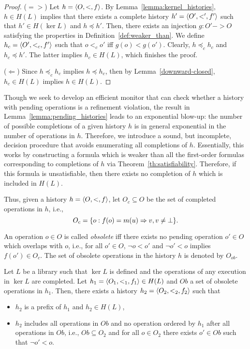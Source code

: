 \begin{proof}

($=>$) Let $h=\left\langle {O,<,f} \right\rangle$. By Lemma~\ref{lemma:kernel_histories}, $h\in H(L)$ implies that there exists 
a complete history $h'=\left\langle {O',<',f'} \right\rangle$ such that $h'\in H(\ker L)$ and $h\preceq h'$. 
Then, there exists an injection $g:O' -> O$ 
satisfying the properties in Definition~\ref{def:weaker_than}. We define $h_c=\left\langle {O',<_c,f'} \right\rangle$ 
such that $o<_c o'$ iff $g(o) < g(o')$. Clearly, $h\preceq_c h_c$ and $h_c\preceq h'$. The latter implies
$h_c\in H(L)$, which finishes the proof.

($\Leftarrow$) Since $h\preceq_c h_c$ implies $h\preceq h_c$, then by Lemma~\ref{downward-closed},
$h_c\in H(L)$ implies $h\in H(L)$.

\end{proof}

Though we seek to develop an efficient monitor that can check whether a history with pending
operations is a refinement violation, the result in Lemma~\ref{lemma:pending_histories}
leads to an exponential blow-up: the number of possible completions of a given history $h$
is in general exponential in the number of operations in $h$. Therefore, we introduce
a sound, but incomplete, decision procedure that avoids enumerating all completions of $h$.
Essentially, this works by constructing a formula which is weaker than all the first-order formulas
corresponding to completions of $h$ via Theorem~\ref{th:satisfiability}. Therefore, if this formula
is unsatisfiable, then there exists no completion of $h$ which is included in $H(L)$.

Thus, given a history $h=\left\langle {O,<,f} \right\rangle$, let $O_c\subseteq O$ be the set of completed operations
in $h$, i.e., 
\[
O_c={\{ o:f(o)=m(u)=>v,v\neq\bot \}}.
\]

An operation $o\in O$ is called \emph{obsolete} iff there exists no pending operation $o'\in O$ which 
overlaps with $o$, i.e., for all $o'\in O$, $\neg o<o'$ and $\neg o'<o$ implies
$f(o')\in O_c$. The set of obsolete operations in the history $h$ is denoted by $O_{ob}$.
 
\begin{lemma}

Let $L$ be a library such that $\ker L$ is defined and the operations of any execution in $\ker L$ are completed.
Let $h_1=\left\langle {O_1,<_1,f_1} \right\rangle\in H(L)$ and $Ob$ a set of obsolete operations in $h_1$. Then, there exists a 
history $h_2=\left\langle {O_2,<_2,f_2} \right\rangle$ such that 

\begin{itemize}

	\item $h_2$ is a prefix of $h_1$ and $h_2\in H(L)$, 

	\item $h_2$ includes all operations in $Ob$ and no operation ordered by $h_1$ after all operations in $Ob$, i.e.,
	$Ob\subseteq O_2$ and for all $o\in O_2$ there exists $o'\in Ob$ such that $\neg o'<o$.
	
\end{itemize}

\end{lemma}


